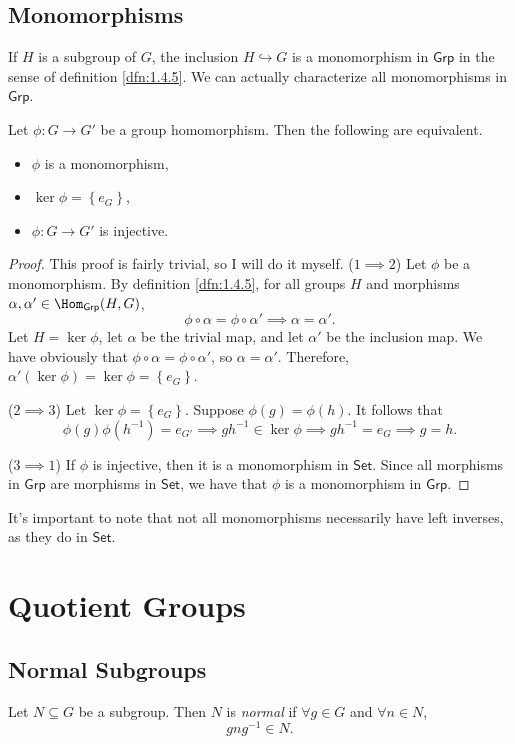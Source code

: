 \subsection{Monomorphisms}
If $H$ is a subgroup of $G$, the inclusion $H\hookrightarrow G$ is a monomorphism in $\mathsf{Grp}$ in the sense of definition \ref{dfn:1.4.5}. We can actually characterize all monomorphisms in $\mathsf{Grp}$.
\begin{proposition}\label{prp:2.6.6}
	Let $\phi : G \to G'$ be a group homomorphism. Then the following are equivalent.
	\begin{itemize}
		\item $\phi $ is a monomorphism,
		\item $\ker \phi =\left\{ e_G \right\} $,
		\item $\phi : G \to G'$ is injective.
	\end{itemize}
\end{proposition}
\begin{proof}
	This proof is fairly trivial, so I will do it myself. ($1\implies 2$) Let $\phi $ be a monomorphism. By definition \ref{dfn:1.4.5}, for all groups $H$ and morphisms $\alpha ,\alpha'\in \Hom_{\mathsf{Grp}}(H , G) $,
	\[
		\phi \circ \alpha =\phi \circ \alpha ' \implies \alpha =\alpha '
	.\]
	Let $H=\ker \phi $, let $\alpha $ be the trivial map, and let $\alpha '$ be the inclusion map. We have obviously that $\phi \circ \alpha =\phi \circ \alpha '$, so $\alpha =\alpha '$. Therefore, $\alpha '(\ker \phi )=\ker \phi =\left\{ e_G \right\} $.

	($2 \implies 3$) Let $\ker \phi =\left\{ e_G \right\} $. Suppose $\phi (g)=\phi (h)$. It follows that
	\[
		\phi(g)\phi(h^{-1})=e_{G'}\implies gh^{-1}\in \ker \phi \implies gh^{-1}=e_G\implies g=h
	.\]
	
	($3\implies 1$) If $\phi $ is injective, then it is a monomorphism in $\mathsf{Set}$. Since all morphisms in $\mathsf{Grp}$ are morphisms in $\mathsf{Set}$, we have that $\phi $ is a monomorphism in $\mathsf{Grp}$.
\end{proof}

It's important to note that not all monomorphisms necessarily have left inverses, as they do in $\mathsf{Set}$.

\section{Quotient Groups}
\subsection{Normal Subgroups}
\begin{definition}\label{dfn:2.7.1}
	Let $N\subseteq G$ be a subgroup. Then $N$ is \emph{normal} if $\forall g\in G$ and $\forall n\in N$,
	\[
		gng^{-1}\in N
	.\]
\end{definition}

